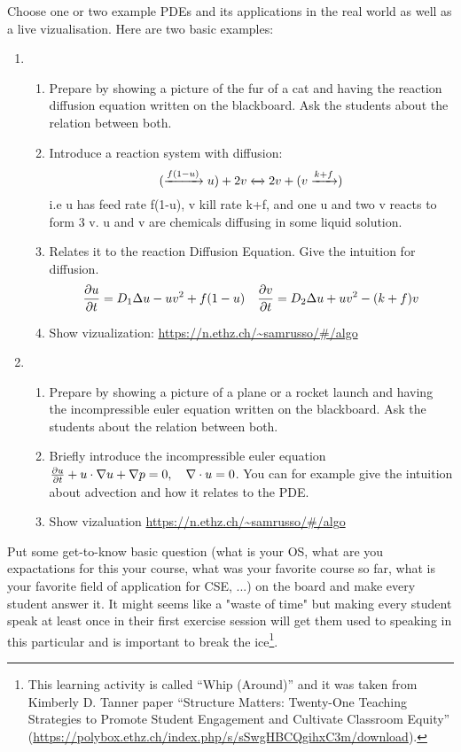 Choose one or two example PDEs and its applications in the real world as well as a live vizualisation. Here are two basic examples:
\begin{enumerate}

\item 
\begin{enumerate}
    \item Prepare by showing a picture of the fur of a cat and having the reaction diffusion equation written on the blackboard. Ask the students about the relation between both.
    \item Introduce a reaction system with diffusion: $$(\xrightarrow{f(1-u)} u) + 2v \xleftrightarrow{} 2v + (v \xrightarrow{k+f})$$ i.e u has feed rate f(1-u), v kill rate k+f, and one u and two v reacts to form 3 v. u and v are chemicals diffusing in some liquid solution.
    \item Relates it to the reaction Diffusion Equation. Give the intuition for diffusion.
    \begin{equation}
     \pdv{u}{t} = {D}_{1}\Delta u - uv^2 + f(1-u)
     \quad
     \pdv{v}{t} = {D}_{2}\Delta u + uv^2 - (k+f)v
    \end{equation}
    \item Show vizualization: \url{https://n.ethz.ch/~samrusso/#/algo}
\end{enumerate}

\item
\begin{enumerate}
    \item Prepare by showing a picture of a plane or a rocket launch and having the incompressible euler equation written on the blackboard. Ask the students about the relation between both.
    \item Briefly introduce the incompressible euler equation $\pdv{u}{t} + u \cdot \nabla{u} + \nabla{p} = 0, \quad \nabla \cdot u = 0$. You can for example give the intuition about advection and how it relates to the PDE.
    \item Show vizaluation \url{https://n.ethz.ch/~samrusso/#/algo}
\end{enumerate}

\end{enumerate}




Put some get-to-know basic question (what is your OS, what are you expactations for this your course, what was your favorite course so far, what is your favorite field of application for CSE, ...) on the board and make every student answer it. It might seems like a "waste of time" but making every student speak at least once in their first exercise session will get them used to speaking in this particular and is important to break the ice\footnote{This learning activity is called “Whip (Around)” and
it was taken from Kimberly D. Tanner paper “Structure Matters:
Twenty-One Teaching Strategies to Promote Student Engagement and
Cultivate Classroom Equity”
(\url{https://polybox.ethz.ch/index.php/s/sSwgHBCQgihxC3m/download}).}.


